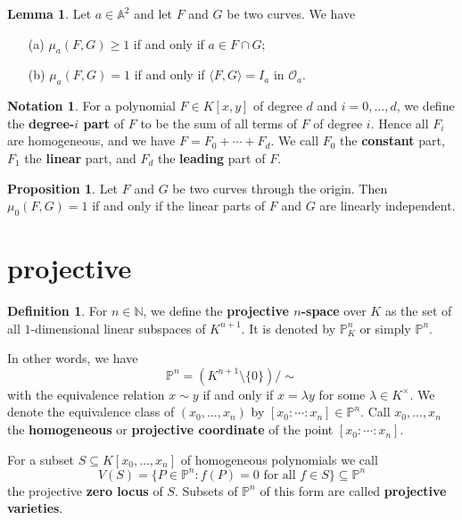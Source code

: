 \documentclass[12pt]{article}
\theoremstyle{definition}
\newtheorem{lem}{Lemma}
\newtheorem{prop}{Proposition}
\newtheorem{defn}{Definition}
\newtheorem{notation}{Notation}
\newcommand{\N}{\mathbb{N}}
\newcommand{\<}{\langle}
\renewcommand{\>}{\rangle}
\newcommand{\A}{\mathbb{A}}
\renewcommand{\P}{\mathbb{P}}
\renewcommand{\O}{\mathscr{O}}
\begin{document}
\begin{lem}
    Let $a \in \A^2$ and let $F$ and $G$ be two curves. We have
    \begin{itemize}
        \item[(a)] $\mu_a(F, G) \geq 1$ if and only if $a \in F \cap G$;
        \item[(b)] $\mu_a(F, G) = 1$ if and only if $\<F, G\> = I_a$ in $\O_a$.
    \end{itemize}
\end{lem}

\begin{notation}
    For a polynomial $F \in K[x, y]$ of degree $d$ and $i = 0, \dots, d$, we define the \textbf{degree-$i$ part} of $F$ to be the sum of all terms of $F$ of degree $i$. Hence all $F_i$ are homogeneous, and we have $F = F_0 + \cdots + F_d$. We call $F_0$ the \textbf{constant} part, $F_1$ the \textbf{linear} part, and $F_d$ the \textbf{leading} part of $F$.
\end{notation}


\begin{prop}
    Let $F$ and $G$ be two curves through the origin. Then $\mu_0(F, G) = 1$ if and only if the linear parts of $F$ and $G$ are linearly independent.
\end{prop}


\section{projective}

\begin{defn}
    For $n \in \N$, we define the \textbf{projective $n$-space} over $K$ as the set of all $1$-dimensional linear subspaces of $K^{n+1}$. It is denoted by $\P_K^n$ or simply $\P^n$.

    In other words, we have
    \[
        \P^n = (K^{n+1} \setminus \{0\}) / \sim
    \]
    with the equivalence relation $x \sim y$ if and only if $x = \lambda y$ for some $\lambda \in K^\times$. We denote the equivalence class of $(x_0, \dots, x_n)$ by $[x_0 : \cdots : x_n] \in \P^n$. Call $x_0, \dots, x_n$ the \textbf{homogeneous} or \textbf{projective coordinate} of the point $[x_0 : \cdots : x_n]$.

    For a subset $S \subseteq K[x_0, \dots, x_n]$ of homogeneous polynomials we call
    \[
        V(S) = \{P \in \P^n : f(P) = 0 \text{ for all } f \in S\} \subseteq \P^n
    \]
    the projective \textbf{zero locus} of $S$. Subsets of $\P^n$ of this form are called \textbf{projective varieties}.
\end{defn}
\end{document}
